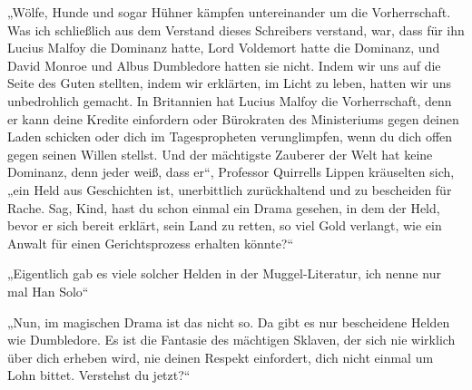 „Wölfe, Hunde und sogar Hühner kämpfen untereinander um die Vorherrschaft. Was ich schließlich aus dem Verstand dieses Schreibers verstand, war, dass für ihn Lucius Malfoy die Dominanz hatte, Lord Voldemort hatte die Dominanz, und David Monroe und Albus Dumbledore hatten sie nicht. Indem wir uns auf die Seite des Guten stellten, indem wir erklärten, im Licht zu leben, hatten wir uns unbedrohlich gemacht. In Britannien hat Lucius Malfoy die Vorherrschaft, denn er kann deine Kredite einfordern oder Bürokraten des Ministeriums gegen deinen Laden schicken oder dich im Tagespropheten verunglimpfen, wenn du dich offen gegen seinen Willen stellst. Und der mächtigste Zauberer der Welt hat keine Dominanz, denn jeder weiß, dass er“, Professor Quirrells Lippen kräuselten sich, „ein Held aus Geschichten ist, unerbittlich zurückhaltend und zu bescheiden für Rache. Sag, Kind, hast du schon einmal ein Drama gesehen, in dem der Held, bevor er sich bereit erklärt, sein Land zu retten, so viel Gold verlangt, wie ein Anwalt für einen Gerichtsprozess erhalten könnte?“

„Eigentlich gab es viele solcher Helden in der Muggel-Literatur, ich nenne nur mal Han Solo“

„Nun, im magischen Drama ist das nicht so. Da gibt es nur bescheidene Helden wie Dumbledore. Es ist die Fantasie des mächtigen Sklaven, der sich nie wirklich über dich erheben wird, nie deinen Respekt einfordert, dich nicht einmal um Lohn bittet. Verstehst du jetzt?“

